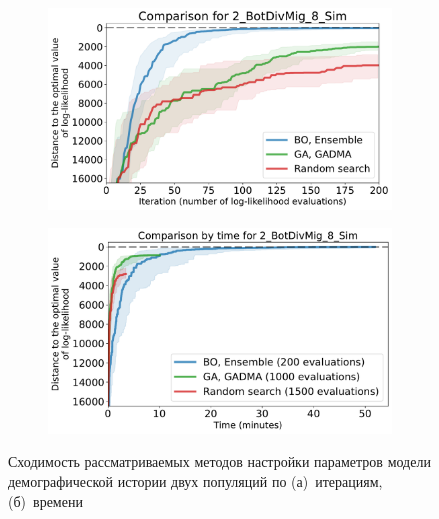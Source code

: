 \begin{figure}[b]
    \centering
    \begin{subfigure}[b]{0.49\linewidth}
        \centering
        \includegraphics[width=\textwidth]{images_experiments/bo_ga/2_BotDivMig_8_Sim_bo_ga.pdf}
        \caption{}
        \label{fig:bo_ga_comp_2pops:iteration}
    \end{subfigure}%
    \begin{subfigure}[b]{0.49\linewidth}
        \centering
        \includegraphics[width=\textwidth]{images_experiments/bo_ga/2_BotDivMig_8_Sim_bo_ga_time.pdf}
        \caption{}
        \label{fig:bo_ga_comp_2pops:time}
    \end{subfigure}
    \caption{Сходимость рассматриваемых методов настройки параметров модели демографической истории двух популяций по (а)~итерациям, (б)~времени}
    \label{fig:bo_ga_comp_2pops}
\end{figure}

